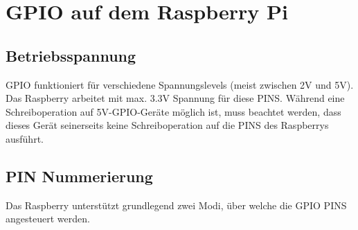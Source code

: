 \documentclass[a4paper,11pt]{article}
\begin{document}
\section{GPIO auf dem Raspberry Pi}
\subsection{Betriebsspannung}
GPIO funktioniert für verschiedene Spannungslevels (meist zwischen 2V und 5V). Das Raspberry arbeitet mit max. 3.3V Spannung für diese PINS. Während eine Schreiboperation auf 5V-GPIO-Geräte möglich ist, muss beachtet werden, dass dieses Gerät seinerseits keine Schreiboperation auf die PINS des Raspberrys ausführt.

\subsection{PIN Nummerierung}
Das Raspberry unterstützt grundlegend zwei Modi, über welche die GPIO PINS angesteuert werden.
\end{document}
